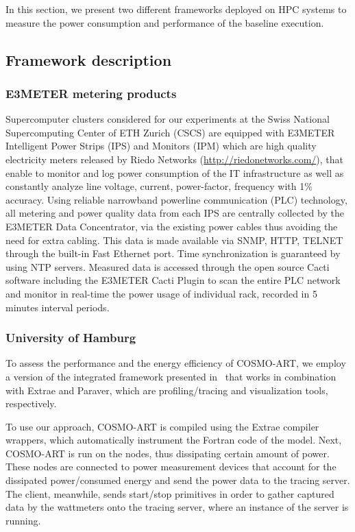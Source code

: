 In this section,  we present two different frameworks  deployed on HPC
systems  to  measure the  power  consumption  and  performance of  the
baseline execution.

\subsection{Framework description}
\label{subsec:3.1}

\subsubsection{E3METER metering products}
Supercomputer  clusters considered  for our  experiments at  the Swiss
National Supercomputing Center of  ETH Zurich (CSCS) are equipped with
E3METER Intelligent  Power Strips (IPS)  and Monitors (IPM)  which are
high   quality   electricity  meters   released   by  Riedo   Networks
(\url{http://riedonetworks.com/}),  that  enable  to monitor  and  log
power  consumption of  the  IT infrastructure  as  well as  constantly
analyze  line  voltage,  current,  power-factor,  frequency  with  1\%
accuracy.   Using reliable  narrowband  powerline communication  (PLC)
technology,  all metering  and power  quality data  from each  IPS are
centrally collected by the E3METER Data Concentrator, via the existing
power cables thus  avoiding the need for extra  cabling.  This data is
made  available  via SNMP,  HTTP,  TELNET  through  the built-in  Fast
Ethernet  port.   Time  synchronization  is guaranteed  by  using  NTP
servers.   Measured data  is accessed  through the  open  source Cacti
software including  the E3METER  Cacti Plugin to  scan the  entire PLC
network and monitor  in real-time the power usage  of individual rack,
recorded in 5 minutes interval periods.

\subsubsection{University of Hamburg}
To assess the  performance and the energy efficiency  of COSMO-ART, we
employ   a    version   of   the    integrated   framework   presented
in~\cite{energy13} that works in  combination with Extrae and Paraver,
which are profiling/tracing and visualization tools, respectively.

To use our  approach, COSMO-ART is compiled using  the Extrae compiler
wrappers,  which  automatically instrument  the  Fortran  code of  the
model. Next, COSMO-ART  is run on the nodes,  thus dissipating certain
amount  of power.   These  nodes are  connected  to power  measurement
devices that account for the dissipated power/consumed energy and send
the power  data to  the tracing server.  The client,  meanwhile, sends
start/stop  primitives  in  order  to  gather  captured  data  by  the
wattmeters onto  the tracing server,  where an instance of  the \pmlib
server is running.


